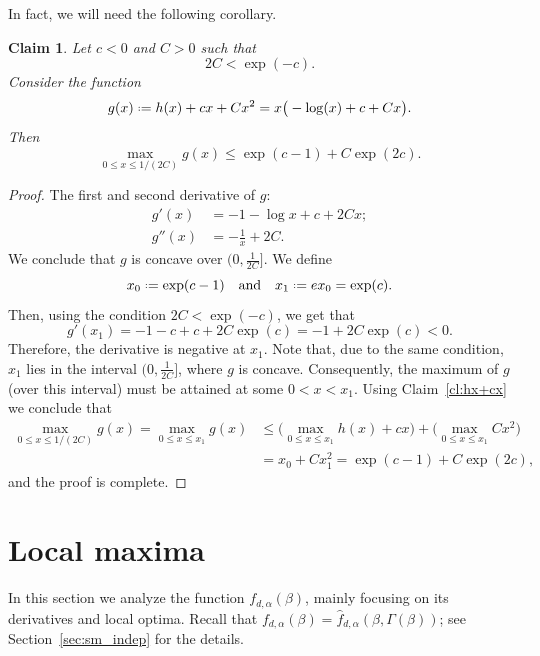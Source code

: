 \documentclass[12pt]{amsart}
\newtheorem{claim}[theorem]{Claim}
\theoremstyle{definition}
\newcommand\fhat{\hat{f}}
\newcommand\al{\alpha}
\newcommand\be{\beta}
\newcommand\Ga{\Gamma}
\newcommand{\defeq}{\mathrel{\vcenter{\baselineskip0.5ex \lineskiplimit0pt
                     \hbox{\scriptsize.}\hbox{\scriptsize.}}}%
                     =}
\begin{document}
In fact, we will need the following corollary.
%
\begin{claim} \label{cl:hx+cx+Cxx}
Let $c<0$ and $C>0$ such that 
%
\[ 2C < \exp(-c) .\]
%
Consider the function 
%
\[ g(x) \defeq h(x)+cx+Cx^2 = x \big( -\log(x) + c + Cx \big) .\]
%
Then 
%
\[ \max_{0 \leq x \leq 1/(2C)} g(x) 
\leq \exp(c-1) + C\exp(2c) .\]
%
\end{claim}
%
\begin{proof}
The first and second derivative of $g$:
%
\begin{align*}
g'(x) &= -1-\log x + c + 2Cx ;\\
g''(x) &= -\frac{1}{x} +  2C .
\end{align*}
%
We conclude that $g$ is concave over $(0,\frac{1}{2C}]$. We define 
%
\[ x_0 \defeq \exp(c-1) 
\quad \text{and} \quad 
x_1 \defeq e x_0 = \exp(c) .\]
%
Then, using the condition $2C < \exp(-c)$, we get that 
%
\[ g'(x_1) = -1-c+c+2C \exp(c) = -1 + 2C \exp(c) < 0 .\]
%
Therefore, the derivative is negative at $x_1$. Note that, due to the same condition, $x_1$ lies in the interval $(0,\frac{1}{2C}]$, where $g$ is concave. Consequently, the maximum of $g$ (over this interval) must be attained at some $0 < x < x_1$. Using Claim~\ref{cl:hx+cx} we conclude that 
%
\begin{align*}
\max_{0 \leq x \leq 1/(2C)} g(x) 
= \max_{0 \leq x \leq x_1} g(x)
&\leq \bigg( \max_{0 \leq x \leq x_1} h(x)+cx \bigg) 
+ \bigg( \max_{0 \leq x \leq x_1} Cx^2 \bigg) \\
&= x_0 + C x_1^2 = \exp(c-1)+ C\exp(2c) ,
\end{align*}
%
and the proof is complete.
\end{proof}
%

\section{Local maxima} \label{sec:local_maxima}

In this section we analyze the function $f_{d,\al}(\be)$, mainly focusing on its derivatives and local optima. Recall that $f_{d,\al}(\be) = \fhat_{d,\al}(\be,\Ga(\be))$; see Section~\ref{sec:sm_indep} for the details. 
\end{document}
